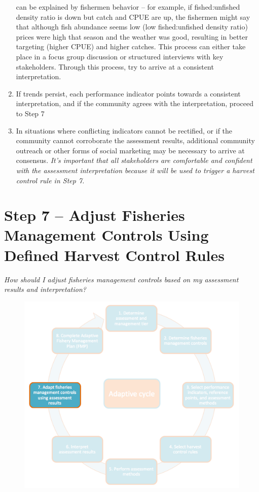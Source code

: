 \documentclass[]{book}
\begin{document}
\begin{enumerate}
  can be explained by fishermen behavior -- for example, if
  fished:unfished density ratio is down but catch and CPUE are up, the
  fishermen might say that although fish abundance seems low (low
  fished:unfished density ratio) prices were high that season and the
  weather was good, resulting in better targeting (higher CPUE) and
  higher catches. This process can either take place in a focus group
  discussion or structured interviews with key stakeholders. Through
  this process, try to arrive at a consistent interpretation.
\item
  If trends persist, each performance indicator points towards a
  consistent interpretation, and if the community agrees with the
  interpretation, proceed to Step 7
\item
  In situations where conflicting indicators cannot be rectified, or if
  the community cannot corroborate the assessment results, additional
  community outreach or other forms of social marketing may be necessary
  to arrive at consensus. \emph{It's important that all stakeholders are
  comfortable and confident with the assessment interpretation because
  it will be used to trigger a harvest control rule in Step 7.}
\end{enumerate}

\chapter{Step 7 -- Adjust Fisheries Management Controls Using Defined
Harvest Control Rules}\label{Step7}

\emph{How should I adjust fisheries management controls based on my
assessment results and interpretation?}

\begin{figure}
\centering
\includegraphics{myMediaFolder/media/Step7.png}
\caption{}
\end{figure}
\end{document}
